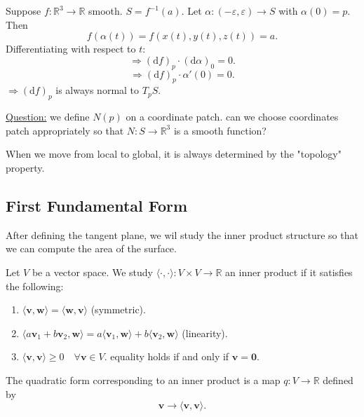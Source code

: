 \documentclass{article}
\begin{document}
\begin{example}
    Suppose $f: \mathbb{R}^3 \to \mathbb{R}$ smooth. $S = f^{-1}(a)$.
Let $\alpha: (-\varepsilon, \varepsilon) \to S$ with $\alpha(0)=p$. Then
\[
f(\alpha(t)) = f(x(t), y(t), z(t)) = a.
\]
Differentiating with respect to $t$:
\[
\Rightarrow (\mathrm{d}f)_p \cdot (\mathrm{d}\alpha)_0 = 0.
\]
\[
\Rightarrow (\mathrm{d}f)_p \cdot \alpha'(0) = 0.
\]
$\Rightarrow (\mathrm{d}f)_p$ is always normal to $T_p S$.
\end{example}

\noindent \underline{Question:} we define $N(p)$ on a coordinate patch. can we choose coordinates patch appropriately so that $N: S \to \mathbb{R}^3$ is a smooth function?

\begin{remark}
    When we move from local to global, it is always determined by the "topology" property.
\end{remark}

\subsection{First Fundamental Form }
After defining the tangent plane, we wil study the inner product structure so that we can compute the area of the surface.

\begin{definition}
    Let $V$ be a vector space. We study $\langle \cdot, \cdot \rangle : V \times V \to \mathbb{R}$ an inner product if it satisfies the following:
\begin{enumerate}
    \item $\langle \mathbf{v}, \mathbf{w} \rangle = \langle \mathbf{w}, \mathbf{v} \rangle$ (symmetric).
    \item $\langle a\mathbf{v}_1 + b\mathbf{v}_2, \mathbf{w} \rangle = a \langle \mathbf{v}_1, \mathbf{w} \rangle + b \langle \mathbf{v}_2, \mathbf{w} \rangle$ (linearity).
    \item $\langle \mathbf{v}, \mathbf{v} \rangle \ge 0 \quad \forall \mathbf{v} \in V$. equality holds if and only if $\mathbf{v}=\mathbf{0}$.
\end{enumerate}
\end{definition}

\begin{definition}
The quadratic form corresponding to an inner product is a map $q: V \to \mathbb{R}$ defined by
\[
\mathbf{v} \to \langle \mathbf{v}, \mathbf{v} \rangle.
\]
\end{definition}
\end{document}
